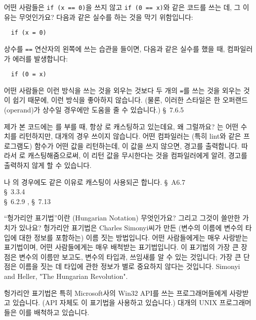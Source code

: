 \begin{faq}
	어떤 사람들은 \verb+if (x == 0)+을 쓰지 않고 \verb+if (0 == x)+와
	같은 코드를 쓰는 데, 그 이유는 무엇인가요?
\A
	다음과 같은 실수를 하는 것을 막기 위함입니다:
\begin{verbatim}
  if (x = 0)
\end{verbatim}
	\noindent 상수를 \verb+==+ 연산자의 왼쪽에 쓰는 습관을 들이면,
	다음과 같은 실수를 했을 때, 컴파일러가 에러를 발생합니다:
\begin{verbatim}
  if (0 = x)
\end{verbatim}
	어떤 사람들은 이런 방식을 쓰는 것을 외우는 것보다 두 개의 \verb+=+를
	쓰는 것을 외우는 것이 쉽기 때문에, 이런 방식을 좋아하지 않습니다.
	(물론, 이러한 스타일은 한 오퍼랜드(operand)가 상수일 경우에만
	도움을 줄 수 있습니다.)
\R
	\cite{hs} \S\ 7.6.5 
\end{faq}

\begin{faq}
	제가 본 코드에는 를 부를 때, 항상 로
	캐스팅하고 있는데요, 왜 그럴까요?
\A
	는 어떤 수치를 리턴하지만, 대개의 경우 쓰이지 않습니다.
	어떤 컴파일러는 (특히 lint와 같은 프로그램도) 함수가 어떤 값을 
	리턴하는데, 이 값을 쓰지 않으면, 경고를 출력합니다.  따라서
	로 캐스팅해줌으로써, 이 리턴 값을 무시한다는 것을
	컴파일러에게 알려, 경고를 출력하지 않게 할 수 있습니다.

	나 의 경우에도 같은 이유로 캐스팅이
	사용되곤 합니다.
\R
	\cite{kr2} \S\ A6.7  \\
	\cite{rationale} \S\ 3.3.4 \\
	\cite{hs} \S\ 6.2.9 , \S\ 7.13 
\end{faq}

\begin{faq}
	``헝가리안 표기법''이란 (Hungarian Notation) 무엇인가요?
	그리고 그것이 쓸만한 가치가 있나요?
\A
	헝가리안 표기법은 Charles Simonyi씨가 만든 (변수의 이름에
	변수의 타입에 대한 정보를 포함하는) 이름 짓는 방법입니다.
	어떤 사람들에게는 매우 사랑받는 표기법이며, 어떤 사람들에게는
	매우 배척받는 표기법입니다.  이 표기법의 가장 큰 장점은 변수의
	이름만 보고도, 변수의 타입과, 쓰임새를 알 수 있는 것입니다;
	가장 큰 단점은 이름을 짓는 데 타입에 관한 정보가 별로 중요하지
	않다는 것입니다.
\R
	Simonyi and Heller, "The Hungarian Revolution".

\T
	헝가리안 표기법은 특히 Microsoft사의 Win32 API를 쓰는 프로그래머들에게
	사랑받고 있습니다.  (API 자체도 이 표기법을 사용하고 있습니다.)
	대개의 UNIX 프로그래머들은 이를 배척하고 있습니다.
\end{faq}

